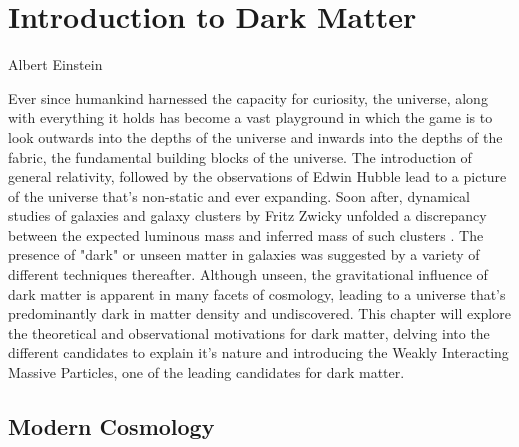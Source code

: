 \chapter{Introduction to Dark Matter}
\label{chap:chap1}


%
{Albert Einstein}%

Ever since humankind harnessed the capacity for curiosity, the universe, along with everything it holds has become a vast playground in which the game is to look outwards into the depths of the universe and inwards into the depths of the fabric, the fundamental building blocks of the universe. The introduction of general relativity, followed by the observations of Edwin Hubble lead to a picture of the universe that's non-static and ever expanding. Soon after, dynamical studies of galaxies and galaxy clusters by Fritz Zwicky unfolded a discrepancy between the expected luminous mass and inferred mass of such clusters \cite{Fritz_Zwicky_1993}. The presence of "dark" or unseen matter in galaxies was suggested by a variety of different techniques thereafter. Although unseen, the gravitational influence of dark matter is apparent in many facets of cosmology, leading to a universe that's predominantly dark in matter density and undiscovered. This chapter will explore the theoretical and observational motivations for dark matter, delving into the different candidates to explain it's nature and introducing the Weakly Interacting Massive Particles, one of the leading candidates for dark matter. 

\section{Modern Cosmology}
\label{sec:moderncosmology}

